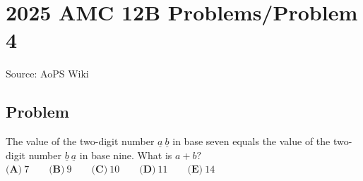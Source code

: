 \documentclass[12pt]{article}
\begin{document}
\section*{{2025 AMC 12B Problems/Problem 4}}
Source: AoPS Wiki

\subsection*{Problem}
The value of the two-digit number $\underline{a}~\underline{b}$ in base seven equals the value of the two-digit number $\underline{b}~\underline{a}$ in base nine. What is $a+b?$ $\textbf{(A)}~7\qquad\textbf{(B)}~9\qquad\textbf{(C)}~10\qquad\textbf{(D)}~11\qquad\textbf{(E)}~14$
\end{document}
